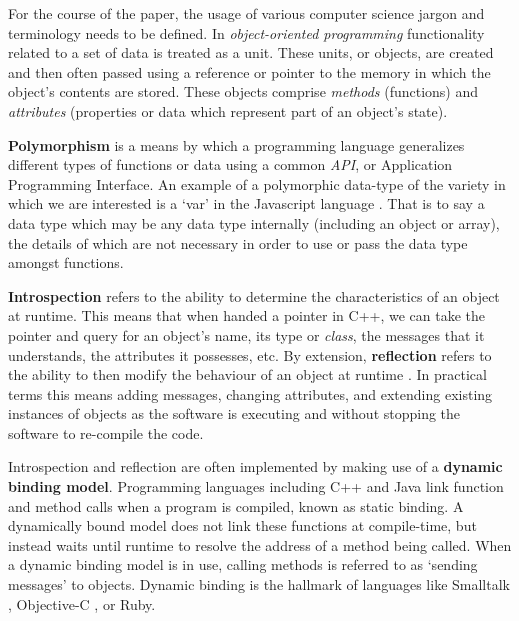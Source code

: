 \documentclass[twoside,10pt]{article}
\begin{document}
For the course of the paper, the usage of various computer science jargon and terminology needs to be defined.  In \emph{object-oriented programming} functionality related to a set of data is treated as a unit.  These units, or objects, are created and then often passed using a reference or pointer to the memory in which the object's contents are stored.  These objects comprise \emph{methods} (functions) and \emph{attributes} (properties or data which represent part of an object's state).

\textbf{Polymorphism} is a means by which a programming language generalizes different types of functions or data using a common \emph{API}, or Application Programming Interface.  An example of a polymorphic data-type of the variety in which we are interested is a `var' in the Javascript language \cite{Flanagan:2002}.  That is to say a data type which may be any data type internally (including an object or array), the details of which are not necessary in order to use or pass the data type amongst functions.

\textbf{Introspection} refers to the ability to determine the characteristics of an object at runtime.  This means that when handed a pointer in C++, we can take the pointer and query for an object's name, its type or \emph{class}, the messages that it understands, the attributes it possesses, etc.  By extension, \textbf{reflection} refers to the ability to then modify the behaviour of an object at runtime \cite{Malenfant:1996}.  In practical terms this means adding messages, changing attributes, and extending existing instances of objects as the software is executing and without stopping the software to re-compile the code.

Introspection and reflection are often implemented by making use of a \textbf{dynamic binding model}.  Programming languages including C++ and Java link function and method calls when a program is compiled, known as static binding.  A dynamically bound model does not link these functions at compile-time, but instead waits until runtime to resolve the address of a method being called.  When a dynamic binding model is in use, calling methods is referred to as `sending messages' to objects. Dynamic binding is the hallmark of languages like Smalltalk \cite{Krasner:1988}, Objective-C \cite{Cox:1986}, or Ruby.
\end{document}
